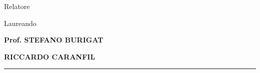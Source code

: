 \begin{titlepage}
\begin{minipage}[t]{0.47\textwidth}
    \vspace{13mm}
    \large{\sc Relatore}\\
\end{minipage}
\hfill
\noindent
\begin{minipage}[t]{0.47\textwidth}\raggedleft
    \vspace{13mm}
    \large{\sc Laureando}\\
\end{minipage}

\begin{minipage}[t]{0.47\textwidth}
    \large\bf{Prof. STEFANO BURIGAT}
\end{minipage}
\hfill
\begin{minipage}[t]{0.47\textwidth}\raggedleft
    \large\bf{RICCARDO CARANFIL}
\end{minipage}

\vspace{18mm}
\begin{center}
    {\rule[0.2cm]{5cm}{0.3mm}\\
    \large{}}
\end{center}
\end{titlepage}
\restoregeometry
